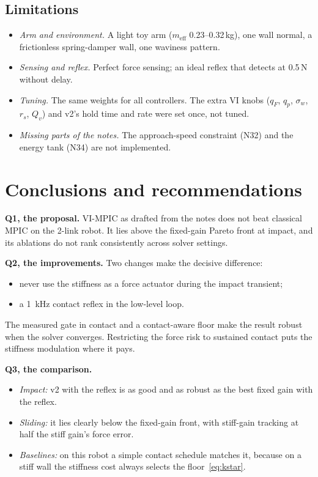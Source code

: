 \documentclass[11pt,a4paper]{article}
\begin{document}
\subsection{Limitations}
\begin{itemize}[leftmargin=14pt]
\item \emph{Arm and environment.} A light toy arm ($m_\mathrm{eff}$ 0.23--0.32\,kg), one wall normal, a
  frictionless spring-damper wall, one waviness pattern.
\item \emph{Sensing and reflex.} Perfect force sensing; an ideal reflex that detects at 0.5\,N without
  delay.
\item \emph{Tuning.} The same weights for all controllers. The extra VI knobs ($q_F$, $q_p$, $\sigma_w$,
  $r_s$, $Q_v$) and v2's hold time and rate were set once, not tuned.
\item \emph{Missing parts of the notes.} The approach-speed constraint (N32) and the energy tank (N34)
  are not implemented.
\end{itemize}

\section{Conclusions and recommendations}\label{sec:concl}

\textbf{Q1, the proposal.} VI-MPIC as drafted from the notes does not beat classical MPIC on the 2-link
robot. It lies above the fixed-gain Pareto front at impact, and its ablations do not rank consistently
across solver settings.

\textbf{Q2, the improvements.} Two changes make the decisive difference:
\begin{itemize}[leftmargin=14pt]
\item never use the stiffness as a force actuator during the impact transient;
\item a \SI{1}{kHz} contact reflex in the low-level loop.
\end{itemize}
The measured gate in contact and a contact-aware floor make the result robust when the solver converges.
Restricting the force risk to sustained contact puts the stiffness modulation where it pays.

\textbf{Q3, the comparison.}
\begin{itemize}[leftmargin=14pt]
\item \emph{Impact:} v2 with the reflex is as good and as robust as the best fixed gain with the reflex.
\item \emph{Sliding:} it lies clearly below the fixed-gain front, with stiff-gain tracking at half the
  stiff gain's force error.
\item \emph{Baselines:} on this robot a simple contact schedule matches it, because on a stiff wall the
  stiffness cost always selects the floor~\eqref{eq:kstar}.
\end{itemize}
\end{document}
